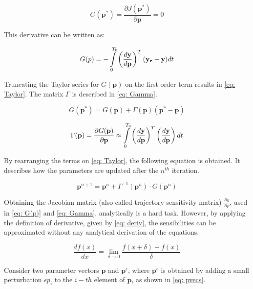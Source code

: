 \begin{equation}
	G(\mathbf{p}^{*}) = \frac{\partial J(\mathbf{p}^{*})}{\partial \mathbf{p}} = 0
\end{equation}

This derivative can be written as:

\begin{equation}	
	G(p) = -\int\displaylimits_{0}^{T_{0}} \left(\frac{d\mathbf{y}}{d\mathbf{p}}\right)^{T} (\mathbf{y_{r}} - \mathbf{y}) dt
	\label{eq: G(p)}
\end{equation}

Truncating the Taylor series for $G(\mathbf{p})$ on the first-order term results in \eqref{eq: Taylor}. The matrix $\Gamma$ is described in \eqref{eq: Gamma}.

\begin{equation}
	G(\mathbf{p}^{*}) = G(\mathbf{p}) + \Gamma (\mathbf{p})(\mathbf{p}^{*} - \mathbf{p})
	\label{eq: Taylor}
\end{equation}

\begin{equation}
	\Gamma (\mathbf{p}) = \frac{\partial G(\mathbf{p})}{\partial \mathbf{p}} \approx \int\displaylimits_{0}^{T_{0}} \left(\frac{d\mathbf{y}}{d\mathbf{p}}\right)^{T} \left(\frac{d\mathbf{y}}{d\mathbf{p}}\right) dt
	\label{eq: Gamma}
\end{equation}

By rearranging the terms on \eqref{eq: Taylor}, the following equation is obtained. It describes how the parameters are updated after the $n^{th}$ iteration.

\begin{equation}
	\mathbf{p}^{n+1} = \mathbf{p}^{n} + \Gamma^{-1}(\mathbf{p}^{n})\cdot G(\mathbf{p}^{n})
\end{equation}

Obtaining the Jacobian matrix (also called trajectory sensitivity matrix) $\frac{\partial y}{\partial p}$, used in \eqref{eq: G(p)} and \eqref{eq: Gamma}, analytically is a hard task. However, by applying the definition of derivative, given by \eqref{eq: deriv}, the sensibilities can be approximated without any analytical derivation of the equations.

\begin{equation}
	\frac{df(x)}{dx} = \lim\limits_{\delta \to 0} \frac{f(x + \delta) - f(x)}{\delta}
	\label{eq: deriv}
\end{equation}

Consider two parameter vectors $\mathbf{p}$ and $\mathbf{p}^{\epsilon}$, where $\mathbf{p}^{\epsilon}$ is obtained by adding a small perturbation $\epsilon p_{i}$ to the $i-th$ element of $\mathbf{p}$, as shown in \eqref{eq: pvecs}.

